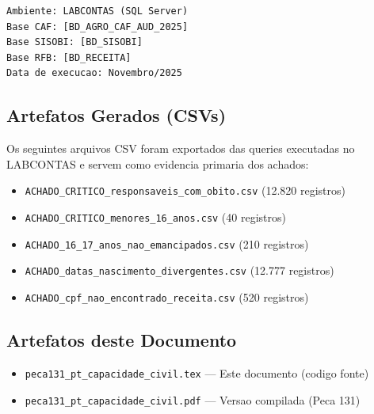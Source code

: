\documentclass[11pt,a4paper]{article}
\begin{document}
\begin{verbatim}
Ambiente: LABCONTAS (SQL Server)
Base CAF: [BD_AGRO_CAF_AUD_2025]
Base SISOBI: [BD_SISOBI]
Base RFB: [BD_RECEITA]
Data de execucao: Novembro/2025
\end{verbatim}

\subsection{Artefatos Gerados (CSVs)}

Os seguintes arquivos CSV foram exportados das queries executadas no LABCONTAS e
servem como evidencia primaria dos achados:

\begin{itemize}
    \item \texttt{ACHADO\_CRITICO\_responsaveis\_com\_obito.csv} (12.820 registros)
    \item \texttt{ACHADO\_CRITICO\_menores\_16\_anos.csv} (40 registros)
    \item \texttt{ACHADO\_16\_17\_anos\_nao\_emancipados.csv} (210 registros)
    \item \texttt{ACHADO\_datas\_nascimento\_divergentes.csv} (12.777 registros)
    \item \texttt{ACHADO\_cpf\_nao\_encontrado\_receita.csv} (520 registros)
\end{itemize}

\subsection{Artefatos deste Documento}

\begin{itemize}
    \item \texttt{peca131\_pt\_capacidade\_civil.tex} --- Este documento (codigo fonte)
    \item \texttt{peca131\_pt\_capacidade\_civil.pdf} --- Versao compilada (Peca 131)
\end{itemize}
\end{document}

